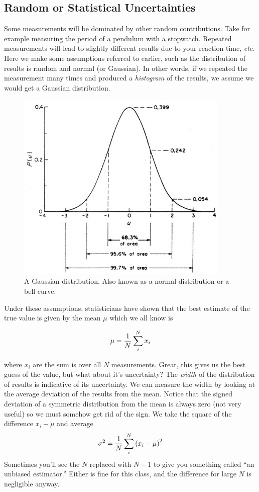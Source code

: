\subsection{Random or Statistical Uncertainties}

Some measurements will be dominated by other random contributions.  Take for
example measuring the period of a pendulum with a stopwatch.  Repeated
measurements will lead to slightly different results due to your reaction time,
{\em etc.}  Here we make some assumptions referred to earlier, such as the
distribution of results is random and normal (or Gaussian).  In other words, if
we repeated the measurement many times and produced a {\em histogram} of the
results, we assume we would get a Gaussian distribution.

\begin{figure}
\includegraphics[width=4in]{../images/gaussian.jpg}
\caption{A Gaussian distribution. Also known as a normal distribution or a bell
  curve.}
\label{fig:gaussian}
\end{figure}

Under these assumptions, statisticians have shown that the best estimate of the
true value is given by the mean $\mu$ which we all know is

\begin{equation}
\mu = { 1 \over N } \sum_i^N x_i
\end{equation}

\noindent where $x_i$ are the sum is over all $N$ measurements.  Great, this
gives us the best guess of the value, but what about it's uncertainty?  The {\em
  width} of the distribution of results is indicative of its uncertainty.  We
can measure the width by looking at the average deviation of the results from
the mean.  Notice that the signed deviation of a symmetric distribution from the
mean is always zero (not very useful) so we must somehow get rid of the sign.
We take the square of the difference $x_i - \mu$ and average
\begin{equation}
\sigma^2 = {1\over N} \sum_i^N \left( x_i - \mu \right)^2
\end{equation}
Sometimes you'll see the $N$ replaced with $N-1$ to give you something called
``an unbiased estimator.''  Either is fine for this class, and the difference
for large $N$ is negligible anyway. 

